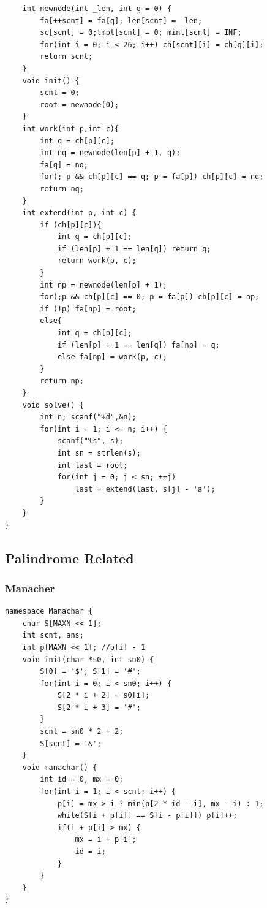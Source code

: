 \documentclass[10pt]{ctexart}
\begin{document}
{\begin{lstlisting}
	int newnode(int _len, int q = 0) {
		fa[++scnt] = fa[q]; len[scnt] = _len;
		sc[scnt] = 0;tmpl[scnt] = 0; minl[scnt] = INF;
		for(int i = 0; i < 26; i++) ch[scnt][i] = ch[q][i];
		return scnt;
	}
	void init() {
		scnt = 0;
		root = newnode(0);
	}
	int work(int p,int c){
		int q = ch[p][c];
		int nq = newnode(len[p] + 1, q);
		fa[q] = nq;
		for(; p && ch[p][c] == q; p = fa[p]) ch[p][c] = nq;
		return nq;
	}
	int extend(int p, int c) {
		if (ch[p][c]){
			int q = ch[p][c];
			if (len[p] + 1 == len[q]) return q;
			return work(p, c);
		}
		int np = newnode(len[p] + 1);
		for(;p && ch[p][c] == 0; p = fa[p]) ch[p][c] = np;
		if (!p) fa[np] = root;
		else{
			int q = ch[p][c];
			if (len[p] + 1 == len[q]) fa[np] = q; 
			else fa[np] = work(p, c);
		}
		return np;
	}
	void solve() {
		int n; scanf("%d",&n);
		for(int i = 1; i <= n; i++) {
			scanf("%s", s);
			int sn = strlen(s);
			int last = root;
			for(int j = 0; j < sn; ++j)
				last = extend(last, s[j] - 'a');
		}
	}
}
\end{lstlisting}
\subsection{Palindrome Related}
\subsubsection{Manacher}
\begin{lstlisting}
namespace Manachar {
	char S[MAXN << 1];
	int scnt, ans;
	int p[MAXN << 1]; //p[i] - 1
	void init(char *s0, int sn0) {
		S[0] = '$'; S[1] = '#';
		for(int i = 0; i < sn0; i++) {
			S[2 * i + 2] = s0[i];
			S[2 * i + 3] = '#';
		}
		scnt = sn0 * 2 + 2;
		S[scnt] = '&';
	}
	void manachar() {
		int id = 0, mx = 0;
		for(int i = 1; i < scnt; i++) {
			p[i] = mx > i ? min(p[2 * id - i], mx - i) : 1;
			while(S[i + p[i]] == S[i - p[i]]) p[i]++;
			if(i + p[i] > mx) {
				mx = i + p[i];
				id = i;
			}
		}
	}
}
\end{lstlisting}
}
\end{document}
